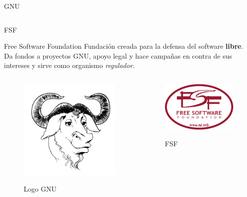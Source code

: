 \documentclass[12pt]{beamer}
\begin{document}
\begin{frame}{GNU}
\begin{columns}
\begin{column}{0.5\textwidth}
		\end{column}
	\end{columns}
\end{frame}

\begin{frame}{FSF}
	\begin{block}{Free Software Foundation}
		Fundación creada para la defensa del software \textbf{libre}. Da fondos a proyectos GNU, apoyo legal y hace campañas en contra de sus intereses y sirve como organismo \textit{regulador.}
	\end{block}
\begin{columns}
	\begin{column}{0.5\textwidth}
	\begin{figure}
		\centering
		\href{https://www.gnu.org/licenses/license-list.html}{\includegraphics[width=0.5\linewidth]{gerwinski-gnu-head}}
		\caption{Logo GNU}
		\label{fig:gerwinski-gnu-head}
	\end{figure}
\end{column}
\begin{column}{0.5\textwidth}
	\begin{figure}
		\centering
		\href{https://www.fsf.org/}{\includegraphics[width=0.7\linewidth]{fsf}}
		\caption{FSF}
		\label{fig:fsf}
	\end{figure}
	
\end{column}
\end{columns}

\end{frame}
\end{document}
